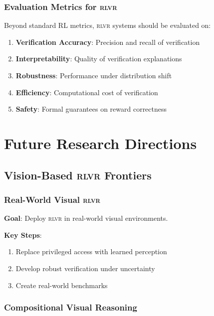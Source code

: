 \documentclass[11pt,a4paper]{article}
\newcommand{\rlvr}{\textsc{rlvr}}
\begin{document}
\subsubsection{Evaluation Metrics for \rlvr{}}

Beyond standard RL metrics, \rlvr{} systems should be evaluated on:

\begin{enumerate}[leftmargin=*]
    \item \textbf{Verification Accuracy}: Precision and recall of verification
    \item \textbf{Interpretability}: Quality of verification explanations
    \item \textbf{Robustness}: Performance under distribution shift
    \item \textbf{Efficiency}: Computational cost of verification
    \item \textbf{Safety}: Formal guarantees on reward correctness
\end{enumerate}

\section{Future Research Directions}
\label{sec:future}

\subsection{Vision-Based \rlvr{} Frontiers}
\label{sec:vision_frontiers}

\subsubsection{Real-World Visual \rlvr{}}

\textbf{Goal}: Deploy \rlvr{} in real-world visual environments.

\textbf{Key Steps}:
\begin{enumerate}[leftmargin=*]
    \item Replace privileged access with learned perception
    \item Develop robust verification under uncertainty
    \item Create real-world benchmarks
\end{enumerate}

\subsubsection{Compositional Visual Reasoning}
\end{document}
